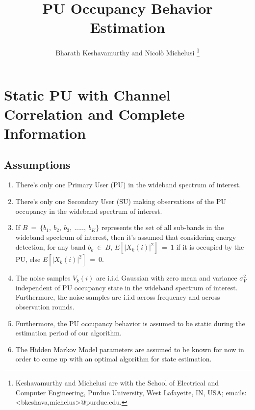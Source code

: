 \documentclass[12pt, draftcls, onecolumn]{IEEEtran}
\newcommand{\nm}[1]{{\color{blue}\text{\bf{[NM: #1]}}}}
\begin{document}
 
\title{PU Occupancy Behavior Estimation}
\author{Bharath Keshavamurthy and Nicol\`{o} Michelusi
\thanks{Keshavamurthy and Michelusi are with the School of Electrical and Computer Engineering, Purdue University, West Lafayette, IN, USA; emails:<bkeshava,michelus>@purdue.edu.}}
\maketitle
{}
\maketitle
\section{Static PU with Channel Correlation and Complete Information}
\subsection{Assumptions}
\begin{enumerate}
    \item There's only one Primary User (PU) in the wideband spectrum of interest.
    \item There's only one Secondary User (SU) making observations of the PU occupancy in the wideband spectrum of interest.
    \item If $B\ =\ \{b_1,\ b_2,\ b_3,\ .....,\ b_K\}$ represents the set of all sub-bands in the wideband spectrum of interest, then it's assumed that considering energy detection, for any band $b_k\ \in\ B$, $E[|X_k(i)|^2]\ =\ 1$ if it is occupied by the PU, else $E[|X_k(i)|^2]\ =\ 0$.
    \item The noise samples $V_k(i)$ are i.i.d \nm{circular?} Gaussian with zero mean and variance $\sigma_V^2$ independent of PU occupancy state in the wideband spectrum of interest. Furthermore, the noise samples are i.i.d across frequency and across observation rounds.
    \item Furthermore, the PU occupancy behavior is assumed to be static during the estimation period of our algorithm.
    \item The Hidden Markov Model parameters are assumed to be known for now in order to come up with an optimal algorithm for state estimation.
\end{enumerate}
\end{document}
